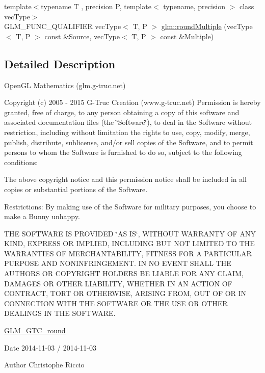 \begin{DoxyCompactItemize}
\item 
{\footnotesize template$<$typename T , precision P, template$<$ typename, precision $>$ class vec\-Type$>$ }\\G\-L\-M\-\_\-\-F\-U\-N\-C\-\_\-\-Q\-U\-A\-L\-I\-F\-I\-E\-R vec\-Type$<$ T, P $>$ \hyperlink{group__gtc__round_ga10a8ab7b254257b607b6a3fc68c3e661}{glm\-::round\-Multiple} (vec\-Type$<$ T, P $>$ const \&Source, vec\-Type$<$ T, P $>$ const \&Multiple)
\end{DoxyCompactItemize}


\subsection{Detailed Description}
Open\-G\-L Mathematics (glm.\-g-\/truc.\-net)

Copyright (c) 2005 -\/ 2015 G-\/\-Truc Creation (www.\-g-\/truc.\-net) Permission is hereby granted, free of charge, to any person obtaining a copy of this software and associated documentation files (the \char`\"{}\-Software\char`\"{}), to deal in the Software without restriction, including without limitation the rights to use, copy, modify, merge, publish, distribute, sublicense, and/or sell copies of the Software, and to permit persons to whom the Software is furnished to do so, subject to the following conditions\-:

The above copyright notice and this permission notice shall be included in all copies or substantial portions of the Software.

Restrictions\-: By making use of the Software for military purposes, you choose to make a Bunny unhappy.

T\-H\-E S\-O\-F\-T\-W\-A\-R\-E I\-S P\-R\-O\-V\-I\-D\-E\-D \char`\"{}\-A\-S I\-S\char`\"{}, W\-I\-T\-H\-O\-U\-T W\-A\-R\-R\-A\-N\-T\-Y O\-F A\-N\-Y K\-I\-N\-D, E\-X\-P\-R\-E\-S\-S O\-R I\-M\-P\-L\-I\-E\-D, I\-N\-C\-L\-U\-D\-I\-N\-G B\-U\-T N\-O\-T L\-I\-M\-I\-T\-E\-D T\-O T\-H\-E W\-A\-R\-R\-A\-N\-T\-I\-E\-S O\-F M\-E\-R\-C\-H\-A\-N\-T\-A\-B\-I\-L\-I\-T\-Y, F\-I\-T\-N\-E\-S\-S F\-O\-R A P\-A\-R\-T\-I\-C\-U\-L\-A\-R P\-U\-R\-P\-O\-S\-E A\-N\-D N\-O\-N\-I\-N\-F\-R\-I\-N\-G\-E\-M\-E\-N\-T. I\-N N\-O E\-V\-E\-N\-T S\-H\-A\-L\-L T\-H\-E A\-U\-T\-H\-O\-R\-S O\-R C\-O\-P\-Y\-R\-I\-G\-H\-T H\-O\-L\-D\-E\-R\-S B\-E L\-I\-A\-B\-L\-E F\-O\-R A\-N\-Y C\-L\-A\-I\-M, D\-A\-M\-A\-G\-E\-S O\-R O\-T\-H\-E\-R L\-I\-A\-B\-I\-L\-I\-T\-Y, W\-H\-E\-T\-H\-E\-R I\-N A\-N A\-C\-T\-I\-O\-N O\-F C\-O\-N\-T\-R\-A\-C\-T, T\-O\-R\-T O\-R O\-T\-H\-E\-R\-W\-I\-S\-E, A\-R\-I\-S\-I\-N\-G F\-R\-O\-M, O\-U\-T O\-F O\-R I\-N C\-O\-N\-N\-E\-C\-T\-I\-O\-N W\-I\-T\-H T\-H\-E S\-O\-F\-T\-W\-A\-R\-E O\-R T\-H\-E U\-S\-E O\-R O\-T\-H\-E\-R D\-E\-A\-L\-I\-N\-G\-S I\-N T\-H\-E S\-O\-F\-T\-W\-A\-R\-E.

\hyperlink{group__gtc__round}{G\-L\-M\-\_\-\-G\-T\-C\-\_\-round}

\begin{DoxyDate}{Date}
2014-\/11-\/03 / 2014-\/11-\/03 
\end{DoxyDate}
\begin{DoxyAuthor}{Author}
Christophe Riccio 
\end{DoxyAuthor}

